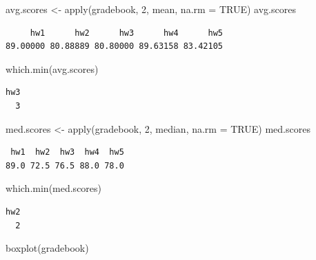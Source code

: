 \documentclass[
  letterpaper,
  DIV=11,
  numbers=noendperiod]{scrartcl}
\newenvironment{Shaded}{\begin{snugshade}}{\end{snugshade}}
\newcommand{\AttributeTok}[1]{\textcolor[rgb]{0.40,0.45,0.13}{#1}}
\newcommand{\ConstantTok}[1]{\textcolor[rgb]{0.56,0.35,0.01}{#1}}
\newcommand{\DecValTok}[1]{\textcolor[rgb]{0.68,0.00,0.00}{#1}}
\newcommand{\FunctionTok}[1]{\textcolor[rgb]{0.28,0.35,0.67}{#1}}
\newcommand{\NormalTok}[1]{\textcolor[rgb]{0.00,0.23,0.31}{#1}}
\newcommand{\OtherTok}[1]{\textcolor[rgb]{0.00,0.23,0.31}{#1}}
\begin{document}
\begin{Shaded}
\begin{Highlighting}[]
\NormalTok{avg.scores }\OtherTok{\textless{}{-}} \FunctionTok{apply}\NormalTok{(gradebook, }\DecValTok{2}\NormalTok{, mean, }\AttributeTok{na.rm =} \ConstantTok{TRUE}\NormalTok{)}
\NormalTok{avg.scores}
\end{Highlighting}
\end{Shaded}

\begin{verbatim}
     hw1      hw2      hw3      hw4      hw5 
89.00000 80.88889 80.80000 89.63158 83.42105 
\end{verbatim}

\begin{Shaded}
\begin{Highlighting}[]
\FunctionTok{which.min}\NormalTok{(avg.scores)}
\end{Highlighting}
\end{Shaded}

\begin{verbatim}
hw3 
  3 
\end{verbatim}

\begin{Shaded}
\begin{Highlighting}[]
\NormalTok{med.scores }\OtherTok{\textless{}{-}} \FunctionTok{apply}\NormalTok{(gradebook, }\DecValTok{2}\NormalTok{, median, }\AttributeTok{na.rm =} \ConstantTok{TRUE}\NormalTok{)}
\NormalTok{med.scores}
\end{Highlighting}
\end{Shaded}

\begin{verbatim}
 hw1  hw2  hw3  hw4  hw5 
89.0 72.5 76.5 88.0 78.0 
\end{verbatim}

\begin{Shaded}
\begin{Highlighting}[]
\FunctionTok{which.min}\NormalTok{(med.scores)}
\end{Highlighting}
\end{Shaded}

\begin{verbatim}
hw2 
  2 
\end{verbatim}

\begin{Shaded}
\begin{Highlighting}[]
\FunctionTok{boxplot}\NormalTok{(gradebook)}
\end{Highlighting}
\end{Shaded}
\end{document}
